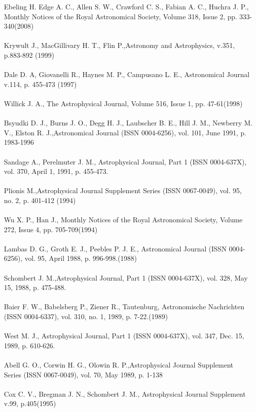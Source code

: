 Ebeling H. Edge A. C., Allen S. W., Crawford C. S., Fabian A. C., Huchra J. P., Monthly Notices of the Royal Astronomical Society, Volume 318, Issue 2, pp. 333-340(2008)\\\\
Krywult J., MacGillivary H. T., Flin P.,Astronomy and Astrophysics, v.351, p.883-892 (1999)\\\\
Dale D. A, Giovanelli R., Haynes M. P., Campusano L. E., Astronomical Journal v.114, p. 455-473 (1997)\\\\
Willick J. A., The Astrophysical Journal, Volume 516, Issue 1, pp. 47-61(1998)\\\\
Bsyudki D. J., Burns J. O., Degg H. J., Laubscher B. E., Hill J. M., Newberry M. V., Elston R. J.,Astronomical Journal (ISSN 0004-6256), vol. 101, June 1991, p. 1983-1996\\\\
Sandage A., Perelmuter J. M., Astrophysical Journal, Part 1 (ISSN 0004-637X), vol. 370, April 1, 1991, p. 455-473.\\\\
Plionis M.,Astrophysical Journal Supplement Series (ISSN 0067-0049), vol. 95, no. 2, p. 401-412  (1994)\\\\
Wu X. P., Han J., Monthly Notices of the Royal Astronomical Society, Volume 272, Issue 4, pp. 705-709(1994)\\\\
Lambas D. G., Groth E. J., Peebles P. J. E., Astronomical Journal (ISSN 0004-6256), vol. 95, April 1988, p. 996-998.(1988)\\\\
Schombert J. M.,Astrophysical Journal, Part 1 (ISSN 0004-637X), vol. 328, May 15, 1988, p. 475-488. \\\\
Baier F. W., Babelsberg P., Ziener R., Tautenburg, Astronomische Nachrichten (ISSN 0004-6337), vol. 310, no. 1, 1989, p. 7-22.(1989)\\\\
West M. J., Astrophysical Journal, Part 1 (ISSN 0004-637X), vol. 347, Dec. 15, 1989, p. 610-626.\\\\
Abell G. O., Corwin H. G., Olowin R. P.,Astrophysical Journal Supplement Series (ISSN 0067-0049), vol. 70, May 1989, p. 1-138\\\\
Cox C. V., Bregman J. N., Schombert J. M., Astrophysical Journal Supplement v.99, p.405(1995)\\\\